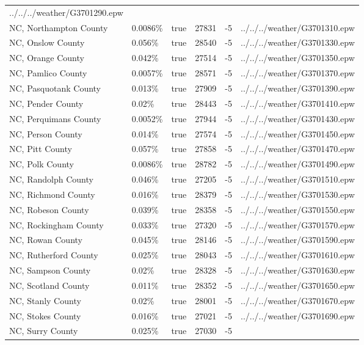 \begin{longtable}[]{@{}llllll@{}}
../../../weather/G3701290.epw \\
NC, Northampton County & 0.0086\% & true & 27831 & -5 &
../../../weather/G3701310.epw \\
NC, Onslow County & 0.056\% & true & 28540 & -5 &
../../../weather/G3701330.epw \\
NC, Orange County & 0.042\% & true & 27514 & -5 &
../../../weather/G3701350.epw \\
NC, Pamlico County & 0.0057\% & true & 28571 & -5 &
../../../weather/G3701370.epw \\
NC, Pasquotank County & 0.013\% & true & 27909 & -5 &
../../../weather/G3701390.epw \\
NC, Pender County & 0.02\% & true & 28443 & -5 &
../../../weather/G3701410.epw \\
NC, Perquimans County & 0.0052\% & true & 27944 & -5 &
../../../weather/G3701430.epw \\
NC, Person County & 0.014\% & true & 27574 & -5 &
../../../weather/G3701450.epw \\
NC, Pitt County & 0.057\% & true & 27858 & -5 &
../../../weather/G3701470.epw \\
NC, Polk County & 0.0086\% & true & 28782 & -5 &
../../../weather/G3701490.epw \\
NC, Randolph County & 0.046\% & true & 27205 & -5 &
../../../weather/G3701510.epw \\
NC, Richmond County & 0.016\% & true & 28379 & -5 &
../../../weather/G3701530.epw \\
NC, Robeson County & 0.039\% & true & 28358 & -5 &
../../../weather/G3701550.epw \\
NC, Rockingham County & 0.033\% & true & 27320 & -5 &
../../../weather/G3701570.epw \\
NC, Rowan County & 0.045\% & true & 28146 & -5 &
../../../weather/G3701590.epw \\
NC, Rutherford County & 0.025\% & true & 28043 & -5 &
../../../weather/G3701610.epw \\
NC, Sampson County & 0.02\% & true & 28328 & -5 &
../../../weather/G3701630.epw \\
NC, Scotland County & 0.011\% & true & 28352 & -5 &
../../../weather/G3701650.epw \\
NC, Stanly County & 0.02\% & true & 28001 & -5 &
../../../weather/G3701670.epw \\
NC, Stokes County & 0.016\% & true & 27021 & -5 &
../../../weather/G3701690.epw \\
NC, Surry County & 0.025\% & true & 27030 & -5 &

\end{longtable}
